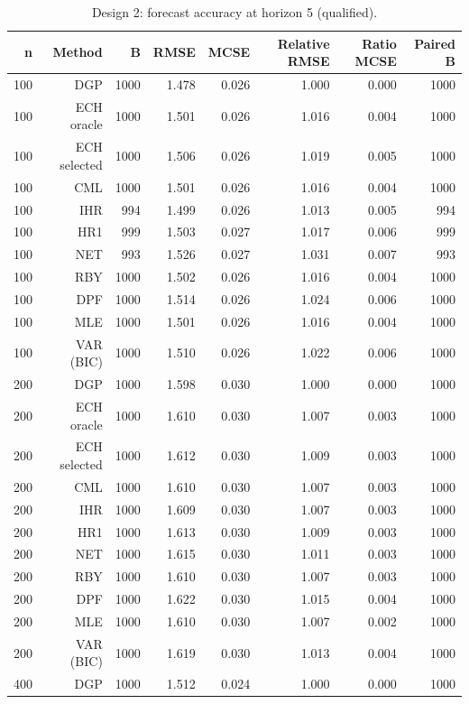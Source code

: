 \begin{table}[p]\centering
\caption{Design 2: forecast accuracy at horizon 5 (qualified).}
\small
\begin{tabular}{rrrrrrrr}\toprule
n & Method & B & RMSE & MCSE & Relative RMSE & Ratio MCSE & Paired B \\\midrule
100 & DGP & 1000 & 1.478 & 0.026 & 1.000 & 0.000 & 1000 \\
100 & ECH oracle & 1000 & 1.501 & 0.026 & 1.016 & 0.004 & 1000 \\
100 & ECH selected & 1000 & 1.506 & 0.026 & 1.019 & 0.005 & 1000 \\
100 & CML & 1000 & 1.501 & 0.026 & 1.016 & 0.004 & 1000 \\
100 & IHR &  994 & 1.499 & 0.026 & 1.013 & 0.005 &  994 \\
100 & HR1 &  999 & 1.503 & 0.027 & 1.017 & 0.006 &  999 \\
100 & NET &  993 & 1.526 & 0.027 & 1.031 & 0.007 &  993 \\
100 & RBY & 1000 & 1.502 & 0.026 & 1.016 & 0.004 & 1000 \\
100 & DPF & 1000 & 1.514 & 0.026 & 1.024 & 0.006 & 1000 \\
100 & MLE & 1000 & 1.501 & 0.026 & 1.016 & 0.004 & 1000 \\
100 & VAR (BIC) & 1000 & 1.510 & 0.026 & 1.022 & 0.006 & 1000 \\
200 & DGP & 1000 & 1.598 & 0.030 & 1.000 & 0.000 & 1000 \\
200 & ECH oracle & 1000 & 1.610 & 0.030 & 1.007 & 0.003 & 1000 \\
200 & ECH selected & 1000 & 1.612 & 0.030 & 1.009 & 0.003 & 1000 \\
200 & CML & 1000 & 1.610 & 0.030 & 1.007 & 0.003 & 1000 \\
200 & IHR & 1000 & 1.609 & 0.030 & 1.007 & 0.003 & 1000 \\
200 & HR1 & 1000 & 1.613 & 0.030 & 1.009 & 0.003 & 1000 \\
200 & NET & 1000 & 1.615 & 0.030 & 1.011 & 0.003 & 1000 \\
200 & RBY & 1000 & 1.610 & 0.030 & 1.007 & 0.003 & 1000 \\
200 & DPF & 1000 & 1.622 & 0.030 & 1.015 & 0.004 & 1000 \\
200 & MLE & 1000 & 1.610 & 0.030 & 1.007 & 0.002 & 1000 \\
200 & VAR (BIC) & 1000 & 1.619 & 0.030 & 1.013 & 0.004 & 1000 \\
400 & DGP & 1000 & 1.512 & 0.024 & 1.000 & 0.000 & 1000 \\

\end{tabular}
\end{table}
